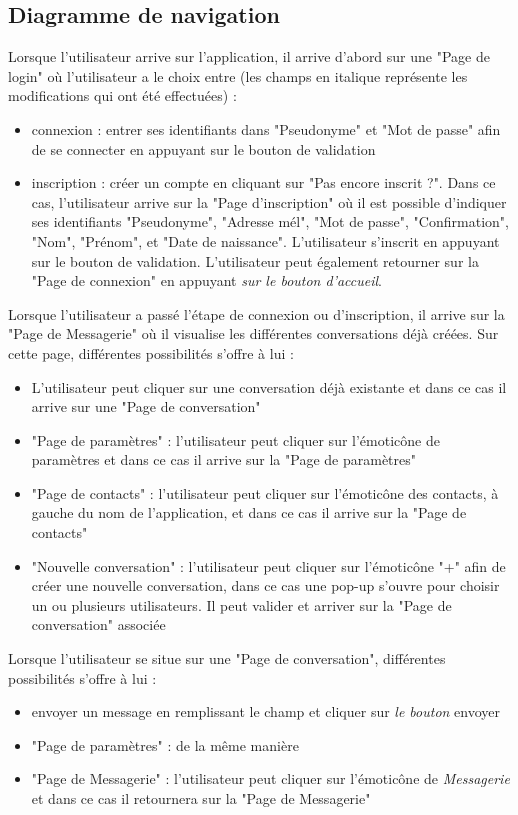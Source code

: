 	\subsection{Diagramme de navigation}
	Lorsque l'utilisateur arrive sur l'application, il arrive d'abord sur une "Page de login" où l'utilisateur a le choix entre (les champs en italique représente les modifications qui ont été effectuées) :
	\begin{itemize}
		\item connexion : entrer ses identifiants dans "Pseudonyme" et "Mot de passe" afin de se connecter en appuyant sur le bouton de validation
		\item inscription : créer un compte en cliquant sur "Pas encore inscrit ?".
		Dans ce cas, l'utilisateur arrive sur la "Page d'inscription" où il est possible d'indiquer ses identifiants "Pseudonyme", "Adresse mél", "Mot de passe", "Confirmation", "Nom", "Prénom", et "Date de naissance".
		L'utilisateur s'inscrit en appuyant sur le bouton de validation.
		L'utilisateur peut également retourner sur la "Page de connexion" en appuyant \textit{sur le bouton d'accueil}.\\
	\end{itemize}

	Lorsque l'utilisateur a passé l'étape de connexion ou d'inscription, il arrive sur la "Page de Messagerie" où il visualise les différentes conversations déjà créées. Sur cette page, différentes possibilités s'offre à lui :
	\begin{itemize}
		\item L'utilisateur peut cliquer sur une conversation déjà existante et dans ce cas il arrive sur une "Page de conversation"
		\item "Page de paramètres" : l'utilisateur peut cliquer sur l’émoticône de paramètres et dans ce cas il arrive sur la "Page de paramètres"
		\item "Page de contacts" : l'utilisateur peut cliquer sur l’émoticône des contacts, à gauche du nom de l'application, et dans ce cas il arrive sur la "Page de contacts"
		\item "Nouvelle conversation" : l'utilisateur peut cliquer sur l’émoticône "+" afin de créer une nouvelle conversation, dans ce cas une pop-up s'ouvre pour choisir un ou plusieurs utilisateurs. Il peut valider et arriver sur la "Page de conversation" associée\\
	\end{itemize}

	Lorsque l'utilisateur se situe sur une "Page de conversation", différentes possibilités s'offre à lui :
	\begin{itemize}
		\item envoyer un message en remplissant le champ et cliquer sur \textit{le bouton} envoyer
		\item "Page de paramètres" : de la même manière
		\item "Page de Messagerie" : l'utilisateur peut cliquer sur l’émoticône de \textit{Messagerie} et dans ce cas il retournera sur la "Page de Messagerie"\\
	\end{itemize}

